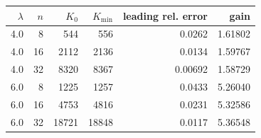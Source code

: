 \begin{tabular}{rrrrrr}
\toprule
$\lambda$ & $n$ & $K_0$ & $K_{\min}$ & leading rel. error & gain\\
\midrule
4.0 & 8 & 544 & 556 & 0.0262 & 1.61802 \\
4.0 & 16 & 2112 & 2136 & 0.0134 & 1.59767 \\
4.0 & 32 & 8320 & 8367 & 0.00692 & 1.58729 \\
6.0 & 8 & 1225 & 1257 & 0.0433 & 5.26040 \\
6.0 & 16 & 4753 & 4816 & 0.0231 & 5.32586 \\
6.0 & 32 & 18721 & 18848 & 0.0117 & 5.36548 \\
\bottomrule
\end{tabular}
